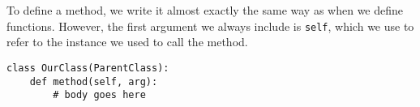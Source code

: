 To define a method, we write it almost exactly the same way as when we define
functions. However, the first argument we always include is \texttt{self}, which
we use to refer to the instance we used to call the method.
\begin{lstlisting}
class OurClass(ParentClass):
    def method(self, arg):
        # body goes here
\end{lstlisting}


